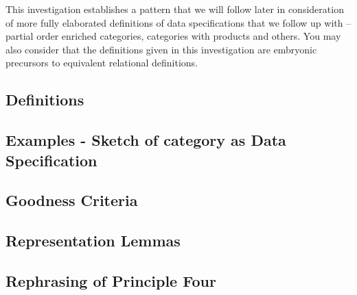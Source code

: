 \documentclass[10pt,a4paper]{article}
\theoremstyle{remark}
\begin{document}
\note 
This investigation establishes a pattern that we will follow later in consideration of more fully elaborated 
definitions of 
data specifications that we follow up with -- partial order enriched categories, categories with products and others. 
You may also consider that the definitions given in this investigation are embryonic precursors to equivalent relational definitions.



\subsection{Definitions}

\subsection{Examples - Sketch of category as Data Specification}

\subsection{Goodness Criteria}

\subsection{Representation Lemmas}

\subsection{Rephrasing of Principle Four}


\iffalse
\section{Case Study}

\fi

 

\end{document}
